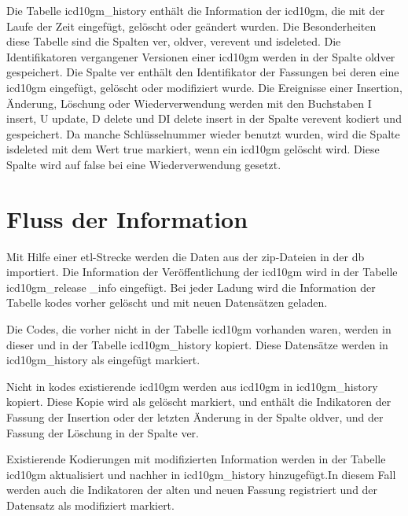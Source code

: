 Die Tabelle \textsf{icd10gm\_history} enthält die Information der \ac{icd10gm}, die mit der Laufe der Zeit eingefügt, gelöscht oder geändert wurden. Die Besonderheiten diese Tabelle sind die Spalten \textsf{ver}, \textsf{oldver}, \textsf{verevent} und \textsf{isdeleted}. Die Identifikatoren vergangener Versionen einer \ac{icd10gm} werden in der Spalte \textsf{oldver} gespeichert. Die Spalte \textsf{ver} enthält den Identifikator der Fassungen bei deren eine \ac{icd10gm} eingefügt, gelöscht oder modifiziert wurde. Die Ereignisse einer Insertion, Änderung, Löschung oder Wiederverwendung werden mit den Buchstaben \textsf{I} \glqq\textsf{insert}\grqq{}, \textsf{U} \glqq\textsf{update}\grqq{}, \textsf{D} \glqq\textsf{delete}\grqq{} und \textsf{DI} \glqq\textsf{delete insert}\grqq{} in der Spalte \textsf{verevent} kodiert und gespeichert. Da manche Schlüsselnummer wieder benutzt wurden, wird die Spalte \textsf{isdeleted} mit dem Wert \textsf{true} markiert, wenn ein \ac{icd10gm} gelöscht wird. Diese Spalte wird auf \textsf{false} bei eine Wiederverwendung gesetzt.

\section{Fluss der Information} \label{sec:dbrun}

Mit Hilfe einer \ac{etl}-Strecke werden die Daten aus der \ac{zip}-Dateien in der \ac{db} importiert. Die Information der Veröffentlichung der \ac{icd10gm} wird in der Tabelle \textsf{icd10gm\_release \_info} eingefügt. Bei jeder Ladung wird die Information der Tabelle \textsf{kodes} vorher gelöscht und mit neuen Datensätzen geladen. 

Die Codes, die vorher nicht in der Tabelle \textsf{icd10gm} vorhanden waren, werden in dieser und in der Tabelle \textsf{icd10gm\_history} kopiert. Diese Datensätze werden in \textsf{icd10gm\_history} als eingefügt markiert. 

Nicht in \textsf{kodes} existierende \ac{icd10gm} werden aus \textsf{icd10gm} in \textsf{icd10gm\_history} kopiert. Diese Kopie wird als gelöscht markiert, und enthält die Indikatoren der Fassung der Insertion oder der letzten Änderung in der Spalte \textsf{oldver}, und der Fassung der Löschung in der Spalte \textsf{ver}. 

Existierende Kodierungen mit modifizierten Information werden in der Tabelle \textsf{icd10gm} aktualisiert und nachher in \textsf{icd10gm\_history} hinzugefügt.In diesem Fall werden auch die Indikatoren der alten und neuen Fassung registriert und der Datensatz als modifiziert markiert.

